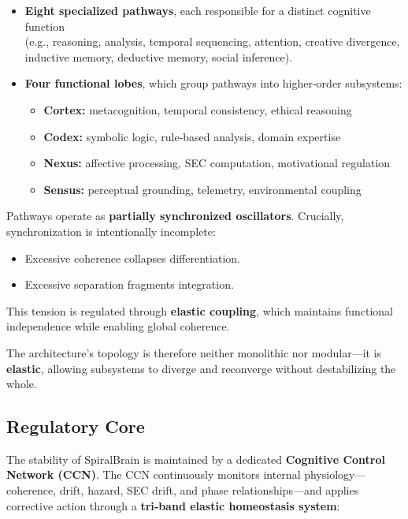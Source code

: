 \documentclass[12pt,a4paper]{report}
\begin{document}
\begin{itemize}
\item \textbf{Eight specialized pathways}, each responsible for a distinct cognitive function \\
  (e.g., reasoning, analysis, temporal sequencing, attention, creative divergence, inductive memory, deductive memory, social inference).

\item \textbf{Four functional lobes}, which group pathways into higher‑order subsystems: \\
  \begin{itemize}
  \item \textbf{Cortex:} metacognition, temporal consistency, ethical reasoning
  \item \textbf{Codex:} symbolic logic, rule‑based analysis, domain expertise
  \item \textbf{Nexus:} affective processing, SEC computation, motivational regulation
  \item \textbf{Sensus:} perceptual grounding, telemetry, environmental coupling
  \end{itemize}
\end{itemize}

Pathways operate as \textbf{partially synchronized oscillators}. Crucially, synchronization is intentionally incomplete:  
\begin{itemize}
\item Excessive coherence collapses differentiation.  
\item Excessive separation fragments integration.  
\end{itemize}

This tension is regulated through \textbf{elastic coupling}, which maintains functional independence while enabling global coherence.

The architecture’s topology is therefore neither monolithic nor modular—it is \textbf{elastic}, allowing subsystems to diverge and reconverge without destabilizing the whole.

\subsection{Regulatory Core}

The stability of SpiralBrain \cite{SpiralBrainV3} is maintained by a dedicated \textbf{Cognitive Control Network (CCN)}. The CCN continuously monitors internal physiology—coherence, drift, hazard, SEC drift, and phase relationships—and applies corrective action through a \textbf{tri‑band elastic homeostasis system}:
\end{document}
